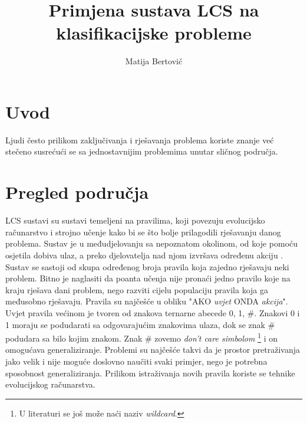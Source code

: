 \documentclass[times, utf8, zavrsni]{fer}
\begin{document}

\title{Primjena sustava LCS na klasifikacijske probleme}

\author{Matija Bertović}

\maketitle

\izvornik

\zahvala{}

\tableofcontents

\chapter{Uvod}
Ljudi često prilikom zaključivanja i rješavanja problema koriste znanje već stečeno susrećući se sa jednostavnijim problemima unutar sličnog područja.


\chapter{Pregled područja}
LCS  sustavi su sustavi temeljeni na pravilima, koji povezuju evolucijsko računarstvo i strojno učenje kako bi se što bolje prilagodili rješavanju danog problema.
Sustav je u međudjelovanju sa nepoznatom okolinom, od koje pomoću osjetila dobiva ulaz, a preko djelovatelja nad njom izvršava određenu akciju \citep{4}.
Sustav se sastoji od skupa određenog broja pravila koja zajedno rješavaju neki problem.
Bitno je naglasiti da poanta učenja nije pronaći jedno pravilo koje na kraju rješava dani problem, nego razviti cijelu populaciju pravila koja ga međusobno rješavaju.
Pravila su najčešće u obliku "AKO \emph{uvjet} ONDA \emph{akcija}".
Uvjet pravila većinom je tvoren od znakova ternarne abecede {0, 1, \#}.
Znakovi 0 i 1 moraju se podudarati sa odgovarajućim znakovima ulaza, dok se znak \# podudara sa bilo kojim znakom.
Znak \# zovemo \emph{don't care simbolom} \footnote{U literaturi se još može naći naziv \emph{wildcard}.} i on omogućava generaliziranje.
Problemi su najčešće takvi da je prostor pretraživanja jako velik i nije moguće doslovno naučiti svaki primjer, nego je potrebna sposobnost generaliziranja.
Prilikom istraživanja novih pravila koriste se tehnike evolucijskog računarstva.
\end{document}
